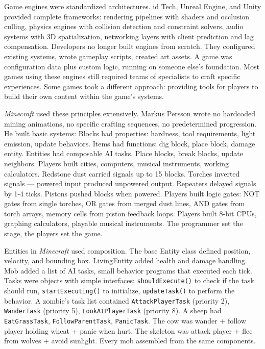 Game engines were standardized architectures. id Tech, Unreal Engine, and Unity provided complete frameworks: rendering pipelines with shaders and occlusion culling, physics engines with collision detection and constraint solvers, audio systems with 3D spatialization, networking layers with client prediction and lag compensation. Developers no longer built engines from scratch. They configured existing systems, wrote gameplay scripts, created art assets.  A game was configuration data plus custom logic, running on someone else's foundation. Most games using these engines still required teams of specialists to craft specific experiences. Some games took a different approach: providing tools for players to build their own content within the game's systems.

\emph{Minecraft} used these principles extensively. Markus Persson wrote no hardcoded mining animations, no specific crafting sequences, no predetermined progression. He built basic systems: Blocks had properties: hardness, tool requirements, light emission, update behaviors. Items had functions: dig block, place block, damage entity. Entities had composable AI tasks.  Place blocks, break blocks, update neighbors. Players built cities, computers, musical instruments, working calculators. Redstone dust carried signals up to 15 blocks. Torches inverted signals — powered input produced unpowered output. Repeaters delayed signals by 1-4 ticks. Pistons pushed blocks when powered. Players built logic gates: NOT gates from single torches, OR gates from merged dust lines, AND gates from torch arrays, memory cells from piston feedback loops.  Players built 8-bit CPUs, graphing calculators, playable musical instruments.  The programmer set the stage, the players set the game.

Entities in \emph{Minecraft} used composition. The base Entity class defined position, velocity, and bounding box. LivingEntity added health and damage handling. Mob added a list of AI tasks, small behavior programs that executed each tick. Tasks were objects with simple interfaces: \texttt{shouldExecute()} to check if the task should run, \texttt{startExecuting()} to initialize, \texttt{updateTask()} to perform the behavior. A zombie's task list contained \texttt{AttackPlayerTask} (priority 2), \texttt{WanderTask} (priority 5), \texttt{LookAtPlayerTask} (priority 8). A sheep had \texttt{EatGrassTask}, \texttt{FollowParentTask}, \texttt{PanicTask}.  The cow was wander + follow player holding wheat + panic when hurt. The skeleton was attack player + flee from wolves + avoid sunlight. Every mob assembled from the same components.

